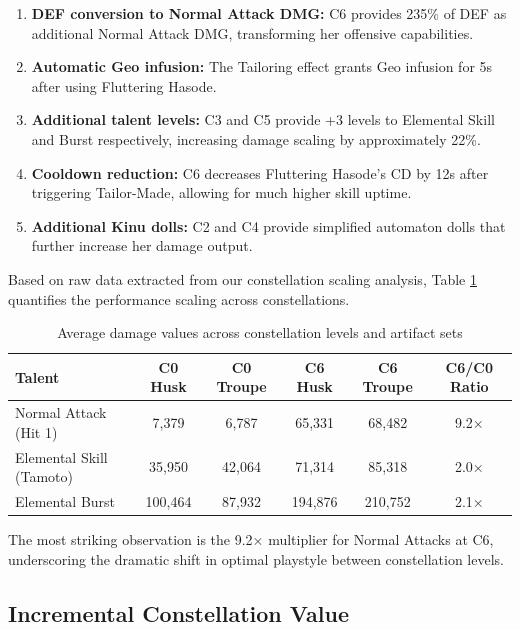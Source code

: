 \documentclass[12pt,a4paper]{article}
\begin{document}
\begin{enumerate}
    \item \textbf{DEF conversion to Normal Attack DMG:} C6 provides 235\% of DEF as additional Normal Attack DMG, transforming her offensive capabilities.
    \item \textbf{Automatic Geo infusion:} The Tailoring effect grants Geo infusion for 5s after using Fluttering Hasode.
    \item \textbf{Additional talent levels:} C3 and C5 provide +3 levels to Elemental Skill and Burst respectively, increasing damage scaling by approximately 22\%.
    \item \textbf{Cooldown reduction:} C6 decreases Fluttering Hasode's CD by 12s after triggering Tailor-Made, allowing for much higher skill uptime.
    \item \textbf{Additional Kinu dolls:} C2 and C4 provide simplified automaton dolls that further increase her damage output.
\end{enumerate}

Based on raw data extracted from our constellation scaling analysis, Table \ref{tab:constellation_scaling} quantifies the performance scaling across constellations.

\begin{table}[h]
\centering
\begin{tabular}{lccccc}
\toprule
\textbf{Talent} & \textbf{C0 Husk} & \textbf{C0 Troupe} & \textbf{C6 Husk} & \textbf{C6 Troupe} & \textbf{C6/C0 Ratio} \\
\midrule
Normal Attack (Hit 1) & 7,379 & 6,787 & 65,331 & 68,482 & 9.2× \\
Elemental Skill (Tamoto) & 35,950 & 42,064 & 71,314 & 85,318 & 2.0× \\
Elemental Burst & 100,464 & 87,932 & 194,876 & 210,752 & 2.1× \\
\bottomrule
\end{tabular}
\caption{Average damage values across constellation levels and artifact sets}
\label{tab:constellation_scaling}
\end{table}

The most striking observation is the 9.2× multiplier for Normal Attacks at C6, underscoring the dramatic shift in optimal playstyle between constellation levels.

\subsection{Incremental Constellation Value}
\end{document}
